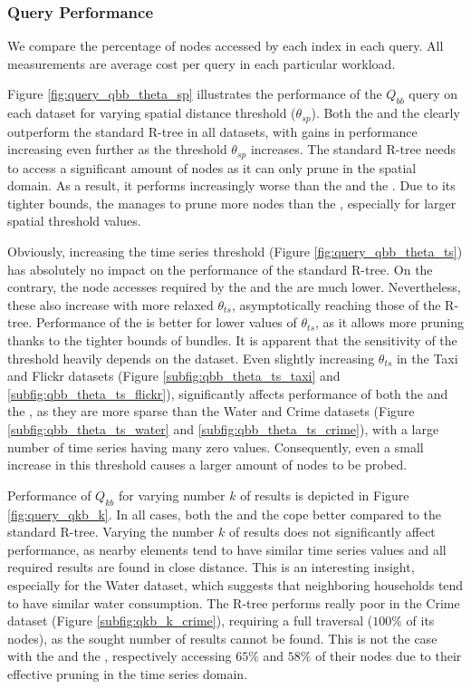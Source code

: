 
\subsubsection{Query Performance}

We compare the percentage of nodes accessed by each index in each query. All measurements are average cost per query in each particular workload.

Figure \ref{fig:query_qbb_theta_sp} illustrates the performance of the $Q_{bb}$ query on each dataset for varying spatial distance threshold ($\theta_{sp}$). Both the \tsr and the \ctsr clearly outperform the standard R-tree in all datasets, with gains in performance increasing even further as the threshold $\theta_{sp}$ increases. The standard R-tree needs to access a significant amount of nodes as it can only prune in the spatial domain. As a result, it performs increasingly worse than the \tsr and the \ctsr. Due to its tighter bounds, the \ctsr manages to prune more nodes than the \tsr, especially for larger spatial threshold values. 

Obviously, increasing the time series threshold (Figure \ref{fig:query_qbb_theta_ts}) has absolutely no impact on the performance of the standard R-tree. On the contrary, the node accesses required by the \tsr and the \ctsr are much lower. Nevertheless, these also increase with more relaxed $\theta_{ts}$, asymptotically reaching those of the R-tree. Performance of the \ctsr is better for lower values of $\theta_{ts}$, as it allows more pruning thanks to the tighter bounds of bundles. It is apparent that the sensitivity of the threshold heavily depends on the dataset. Even slightly increasing $\theta_{ts}$ in the Taxi and Flickr datasets (Figure \ref{subfig:qbb_theta_ts_taxi} and \ref{subfig:qbb_theta_ts_flickr}), significantly affects performance of both the \tsr and the \ctsr, as they are more sparse than the Water and Crime datasets (Figure \ref{subfig:qbb_theta_ts_water} and \ref{subfig:qbb_theta_ts_crime}), with a large number of time series having many zero values. Consequently, even a small increase in this threshold causes a larger amount of nodes to be probed.

Performance of $Q_{kb}$ for varying number $k$ of results is depicted in Figure \ref{fig:query_qkb_k}.  In all cases, both the \tsr and the \ctsr cope better compared to the standard R-tree. Varying the number $k$  of results does not significantly affect performance, as nearby elements tend to have similar time series values and all required results are found in close distance. This is an interesting insight, especially for the Water dataset, which suggests that neighboring households tend to have similar water consumption. The R-tree performs really poor in the Crime dataset (Figure \ref{subfig:qkb_k_crime}), requiring a full traversal ($100\%$ of its nodes), as the sought number of results cannot be found. This is not the case with the \tsr and the \ctsr, respectively accessing $65\%$ and $58\%$ of their nodes due to their effective pruning in the time series domain. 






